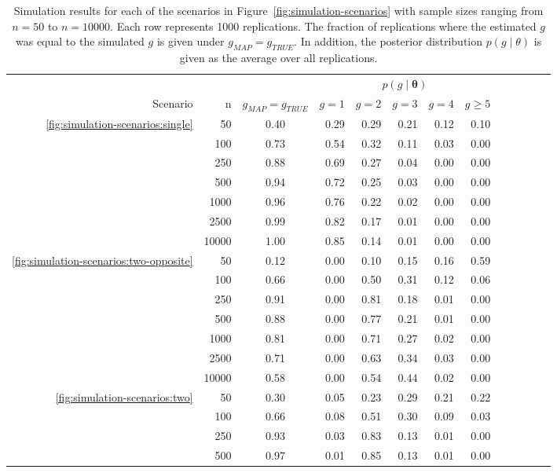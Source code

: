 \begin{table}[ht]
	\caption{Simulation results for each of the scenarios in Figure~\ref{fig:simulation-scenarios} with sample sizes ranging from $n=50$ to $n=10000$. Each row represents 1000 replications. The fraction of replications where the estimated $g$ was equal to the simulated $g$ is given under $g_{MAP} = g_{TRUE}$. In addition, the posterior distribution $p(g \mid \theta)$ is given as the average over all replications.}
	\label{tab:simulation-results}
	\centering
	\begin{tabular}{rrcrrrrrrrrrr}
		\hline
		& & & \multicolumn{5}{c}{$p(g \mid \bm{\theta})$} \\
		Scenario & n & $g_{MAP} = g_{TRUE}$ & $g=1$ & $g=2$ & $g=3$ & $g=4$ & $g\geq5$ \\ 
		\hline
		\ref{fig:simulation-scenarios:single} & 50 & 0.40 & 0.29 & 0.29 & 0.21 & 0.12 & 0.10 \\ 
		& 100 & 0.73 & 0.54 & 0.32 & 0.11 & 0.03 & 0.00 \\ 
		& 250 & 0.88 & 0.69 & 0.27 & 0.04 & 0.00 & 0.00 \\ 
		& 500 & 0.94 & 0.72 & 0.25 & 0.03 & 0.00 & 0.00 \\ 
		& 1000 & 0.96 & 0.76 & 0.22 & 0.02 & 0.00 & 0.00 \\ 
		& 2500 & 0.99 & 0.82 & 0.17 & 0.01 & 0.00 & 0.00 \\ 
		& 10000 & 1.00 & 0.85 & 0.14 & 0.01 & 0.00 & 0.00 \\ 
		\hline
		\ref{fig:simulation-scenarios:two-opposite} & 50 & 0.12 & 0.00 & 0.10 & 0.15 & 0.16 & 0.59 \\ 
		& 100 & 0.66 & 0.00 & 0.50 & 0.31 & 0.12 & 0.06 \\ 
		& 250 & 0.91 & 0.00 & 0.81 & 0.18 & 0.01 & 0.00 \\ 
		& 500 & 0.88 & 0.00 & 0.77 & 0.21 & 0.01 & 0.00 \\ 
		& 1000 & 0.81 & 0.00 & 0.71 & 0.27 & 0.02 & 0.00 \\ 
		& 2500 & 0.71 & 0.00 & 0.63 & 0.34 & 0.03 & 0.00 \\ 
		& 10000 & 0.58 & 0.00 & 0.54 & 0.44 & 0.02 & 0.00 \\
		\hline
		\ref{fig:simulation-scenarios:two} & 50 & 0.30 & 0.05 & 0.23 & 0.29 & 0.21 & 0.22 \\ 
		& 100 & 0.66 & 0.08 & 0.51 & 0.30 & 0.09 & 0.03 \\ 
		& 250 & 0.93 & 0.03 & 0.83 & 0.13 & 0.01 & 0.00 \\ 
		& 500 & 0.97 & 0.01 & 0.85 & 0.13 & 0.01 & 0.00 \\ 

\end{tabular}
\end{table}
